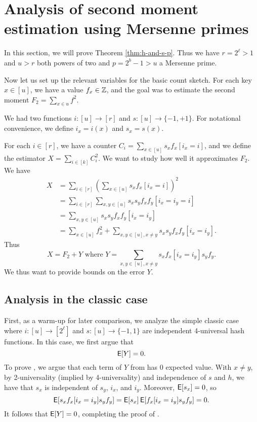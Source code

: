 


\section{Analysis of second moment estimation using  Mersenne primes}\label{sec:analysis-two-for-one}
In this section, we will prove Theorem \ref{thm:h-and-s-p}.  Thus we
have $r=2^\ell>1$ and $u>r$ both powers of two and $p=2^b-1>u$ a
Mersenne prime.

Now let us set up the relevant variables for the basic count sketch.
For each key $x\in [u]$, we have a value $f_x\in \mathbb Z$, and the
goal was to estimate the second moment $F_2=\sum_{x\in u}f^2$.

We had two functions $i:[u]\to[r]$ and $s:[u]\to\{-1,+1\}$. 
For notational convenience, we define $i_x=i(x)$ and $s_x=s(x)$.

For each $i\in [r]$, we have a counter 
$C_i=\sum_{x\in[u]} s_x f_x[i_x=i]$, and we define the 
estimator $X=\sum_{i\in[k]} C_i^2$. We want to study how
well it approximates $F_2$.
We have 
\begin{align*}
X&=\sum_{i\in[r]}\left( \sum_{x\in[u]}s_x f_x[i_x=i]\right)^2\\
&=\sum_{i\in[r]}\sum_{x,y\in[u]}s_x s_y f_x f_y [i_x = i_y = i]\\
&=\sum_{x,y\in[u]}s_x s_y f_x f_y[i_x=i_y]\\
&=\sum_{x\in[u]} f_x^2+\sum_{x,y\in[u],x\neq y} s_x s_y f_x f_y[i_x=i_y] .
\end{align*}
Thus 
\begin{equation}\label{eq:decomp}
   X=F_2+Y\mbox{ where }Y=\sum_{x,y\in[u],x\neq y}
   s_x f_x[i_x=i_y]s_y f_y.
\end{equation}
We thus want to provide bounds on the error $Y$.

\subsection{Analysis in the classic case}
First, as a warm-up for later comparison, we analyze the simple classic case
where $i:[u]\to[2^\ell]$ and
$s:[u]\to\{-1,1\}$ are independent 4-universal hash
functions. In this case, we first argue that 
\begin{equation}\label{eq:mean}
   \operatorname*{\sf{E}}[Y]=0.
\end{equation}
To prove , we argue that each term of
$Y$ from  has 0 expected value. With $x\neq y$, by 2-universality (implied by 4-universality) and independence of $s$ and $h$, we have that $s_x$ is independent of $s_y$, $i_x$, and $i_y$.
Moreover, $\operatorname*{\sf{E}}[s_x]=0$, 
so 
\[\operatorname*{\sf{E}}[s_x f_x[i_x=i_y]s_y f_y]=\operatorname*{\sf{E}}[s_x]\operatorname*{\sf{E}}[f_x[i_x=i_y]s_y f_y]=0.\]
It follows that $\operatorname*{\sf{E}}[Y]=0$, completing the proof of .

